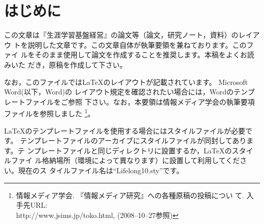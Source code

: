\documentclass[b5paper,10pt,twocolumn,tombow]{jarticle}
\begin{document}
\tableofcontents{}
\bigskip{}

\section{はじめに}
この文章は『生涯学習基盤経営』の論文等（論文，研究ノート，資料）のレイアウ
トを説明した文章です。この文章自体が執筆要領を兼ねております。このファイ
ルをそのまま使用して論文を作成することを推奨します。本稿をよくお読みいた
だき，原稿を作成して下さい。


なお，このファイルでは\LaTeX{}のレイアウトが記載されています。
Microsoft Word(以下，Word)の
レイアウト規定を確認されたい場合には，Wordのテンプレートファイルをご参照
下さい。なお，本要領は情報メディア学会の執筆要項ファイルを参照しました
\footnote{情報メディア学会. 『情報メディア研究』への各種原稿の投稿につい
て. 入手先URL:\\ http://www.jsims.jp/toko.html, (2008--10--27参照)}。

\LaTeX{}のテンプレートファイルを使用する場合にはスタイルファイルが必要です。
テンプレートファイルのアーカイブにスタイルファイルが同封してあります。テ
ンプレートファイルと同じディレクトリに設置するか，\LaTeX{}のスタイルファイ
ル格納場所（環境によって異なります）に設置して利用してください。現在のス
タイルファイル名は``Lifelong10.sty''です。
\end{document}
